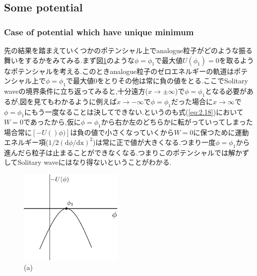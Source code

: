 \documentclass[dvipdfmx,11pt,a4paper]{jsbook}
\begin{document}
\subsection{Some potential}
\subsubsection{Case of potential which have unique minimum}
先の結果を踏まえていくつかのポテンシャル上でanalogue粒子がどのような振る舞いをするかをみてみる.まず図\ref{potential1}のような$\phi=\phi_1$で最大値$U(\phi_1)=0$を取るようなポテンシャルを考える.このときanalogue粒子のゼロエネルギーの軌道はポテンシャル上で$\phi=\phi_1$で最大値0をとりその他は常に負の値をとる.ここでSolitary waveの境界条件に立ち返ってみると,十分遠方($x\rightarrow \pm \infty$)で$\phi=\phi_1$となる必要があるが,図を見てもわかるように例えば$x\rightarrow -\infty$で$\phi=\phi_1$だった場合に$x\rightarrow \infty$で$\phi=\phi_1$にもう一度なることは決してできない.というのも式(\ref{eq:2.18})において$W=0$であったから,仮に$\phi=\phi_1$から右か左のどちらかに転がっていってしまった場合常に$[-U()\phi)]$は負の値で小さくなっていくから$W=0$に保つために運動エネルギー項($1/2(\mathrm{d}\phi/\mathrm{dx})^2$)は常に正で値が大きくなる.つまり一度$\phi=\phi_1$から進んだら粒子は止まることができなくなる.つまりこのポテンシャルでは解かずしてSolitary waveにはなり得ないということがわかる.

\begin{figure}[H]
    \centering
    \includegraphics[width=5cm]{figure/potential1.png}
    \caption{(a)}
    \label{potential1}
\end{figure}
\end{document}

